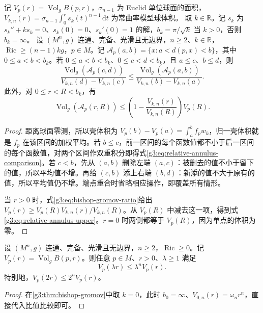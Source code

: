 \begin{proposition}\label{g3:prop:relative-annulus-volume}
	记 \(V_p(r)=\operatorname{Vol}_g B(p,r)\)，\(\sigma_{n-1}\) 为 Euclid 单位球面的面积，\(V_{k,n}(r)=\sigma_{n-1}\int_0^r s_k(t)^{n-1}\,\mathrm dt\) 为常曲率模型球体积。
	取 \(k\in\mathbb R\)。记 \(s_k\) 为 \(s_k''+ks_k=0\)、\(s_k(0)=0\)、\(s_k'(0)=1\) 的解，\(b_k=\pi/\sqrt k\) 当 \(k>0\)，否则 \(b_k=\infty\)。
	设 \((M^n,g)\) 连通、完备、光滑且无边界，\(n\ge2\)、\(k\in\mathbb R\)，\(\operatorname{Ric}\ge(n-1)kg\)，\(p\in M\)。记
	\(\mathcal A_p(a,b)=\{x:a<d(p,x)<b\}\)，其中 \(0\le a<b<b_k\)。若
	\(0\le a<b<b_k\)、\(0\le c<d<b_k\)，且 \(a\le c\)、\(b\le d\)，则
	\begin{equation}\label{g3:eq:relative-annulus-comparison}
		\frac{\operatorname{Vol}_g(\mathcal A_p(c,d))}{V_{k,n}(d)-V_{k,n}(c)}
		\le
		\frac{\operatorname{Vol}_g(\mathcal A_p(a,b))}{V_{k,n}(b)-V_{k,n}(a)}.
	\end{equation}
	此外，对 \(0\le r<R<b_k\)，有
	\begin{equation}\label{g3:eq:relative-annulus-upper}
		\operatorname{Vol}_g(\mathcal A_p(r,R))
		\le\left(1-\frac{V_{k,n}(r)}{V_{k,n}(R)}\right)V_p(R).
	\end{equation}
\end{proposition}
\begin{proof}
	距离球面零测，所以壳体积为 \(V_p(b)-V_p(a)=\int_a^b f_pw_k\)，归一壳体积就是 \(f_p\) 在该区间的加权平均。若 \(b\le c\)，前一区间的每个函数值都不小于后一区间的每个函数值，对两个区间作双重积分即得式\eqref{g3:eq:relative-annulus-comparison}。若 \(c<b\)，先从 \((a,b)\) 删除左端 \((a,c)\)：被删去的值不小于留下的值，所以平均值不增。再给 \((c,b)\) 添上右端 \((b,d)\)：新添的值不大于原有的值，所以平均值仍不增。端点重合时省略相应操作，即覆盖所有情形。

	当 \(r>0\) 时，式\eqref{g3:eq:bishop-gromov-ratio}给出
	\(V_p(r)\ge V_p(R)V_{k,n}(r)/V_{k,n}(R)\)。从 \(V_p(R)\) 中减去这一项，得到式\eqref{g3:eq:relative-annulus-upper}。\(r=0\) 时两侧都等于 \(V_p(R)\)，因为单点的体积为零。
\end{proof}

\begin{corollary}\label{g3:cor:ricci-nonnegative-doubling}
	设 \((M^n,g)\) 连通、完备、光滑且无边界，\(n\ge2\)，\(\operatorname{Ric}\ge0\)。记 \(V_p(r)=\operatorname{Vol}_g B(p,r)\)。则任意 \(p\in M\)、\(r>0\)、\(\lambda\ge1\) 满足
	\[
		V_p(\lambda r)\le\lambda^nV_p(r).
	\]
	特别地，\(V_p(2r)\le2^nV_p(r)\)。
\end{corollary}
\begin{proof}
	在\cref{g3:thm:bishop-gromov}中取 \(k=0\)，此时 \(b_0=\infty\)、\(V_{0,n}(r)=\omega_n r^n\)，直接代入比值比较即可。
\end{proof}

